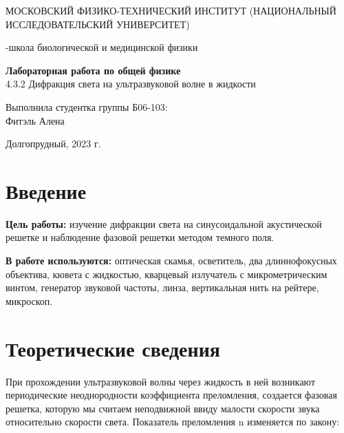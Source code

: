 \documentclass{article}
\begin{document}
\def\figurename{Рисунок}
\begin{titlepage}
\begin{center}
    {\large МОСКОВСКИЙ ФИЗИКО-ТЕХНИЧЕСКИЙ ИНСТИТУТ (НАЦИОНАЛЬНЫЙ ИССЛЕДОВАТЕЛЬСКИЙ УНИВЕРСИТЕТ)}
\end{center}
\begin{center}
    {-школа биологической и медицинской физики}
\end{center}

\vspace{1cm}
{\huge
\begin{center}
    {\bf Лабораторная работа по общей физике}\\
    \vspace{0.5cm}
    4.3.2 Дифракция света на ультразвуковой волне в жидкости
\end{center}
}

\vspace{4cm}
\begin{flushright}
{\LARGE Выполнила студентка группы Б06-103:\\ Фитэль Алена \\}

\end{flushright}
\vspace{9cm}
\begin{center}
    Долгопрудный, 2023 г.
\end{center}
\end{titlepage}
\newpage
\section{Введение}

\textbf{Цель работы:}  изучение дифракции света на синусоидальной акустической решетке и наблюдение фазовой решетки методом темного поля.

\textbf{В работе используются:} оптическая скамья, осветитель, два длиннофокусных объектива, кювета с жидкостью, кварцевый излучатель с микрометрическим винтом, генератор звуковой частоты, линза, вертикальная нить на рейтере, микроскоп.

\section{Теоретические сведения}

При прохождении ультразвуковой волны через жидкость в ней возникают периодические неоднородности коэффициента преломления, создается фазовая решетка, которую мы считаем неподвижной ввиду малости скорости звука относительно скорости света. Показатель
	преломления n изменяется по закону:
	
\end{document}
